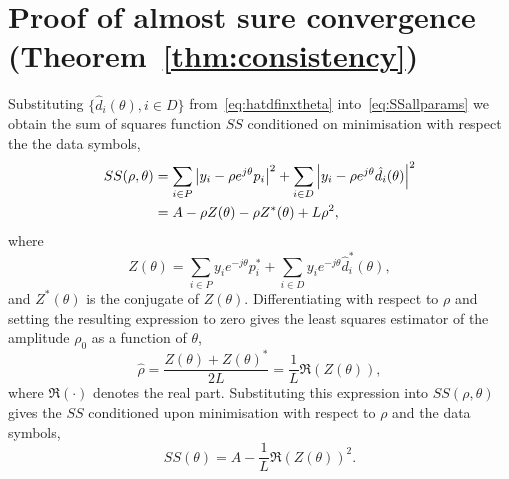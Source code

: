 \documentclass[journal]{IEEEtran}
\begin{document}
\section{Proof of almost sure convergence (Theorem~\ref{thm:consistency}) } \label{sec:proof-almost-sure}

Substituting $\{ \hat{d}_i(\theta), i \in D \}$ from~\eqref{eq:hatdfinxtheta} into~\eqref{eq:SSallparams} we obtain the sum of squares function $SS$ conditioned on minimisation with respect the the data symbols,
 \begin{align*}
SS(\rho, \theta) &=\sum_{i \in P} {\left\vert  y_i - \rho e^{j\theta} p_i  \right\vert}^2 + \sum_{i \in D} {\left\vert  y_i - \rho e^{j\theta} \hat{d_i}(\theta)  \right\vert}^2 \\
&= A - \rho Z(\theta) - \rho Z^*(\theta) + L \rho^2,
\end{align*}
where
\[
Z(\theta)  = \sum_{i \in P} y_i e^{-j\theta} p_i^* + \sum_{i \in D} y_i e^{-j\theta} \hat{d}_i^*(\theta),
\]
and $Z^*(\theta)$ is the conjugate of $Z(\theta)$.  Differentiating with respect to $\rho$ and setting the resulting expression to zero gives the least squares estimator of the amplitude $\rho_0$ as a function of $\theta$, 
\begin{equation}\label{eq:hatrhoZ}
\hat{\rho} = \frac{Z(\theta) + Z(\theta)^*}{2L} = \frac{1}{L}\Re(Z(\theta)),
\end{equation}
where $\Re(\cdot)$ denotes the real part.  Substituting this expression into $SS(\rho, \theta)$ gives the $SS$ conditioned upon minimisation with respect to $\rho$ and the data symbols,
\[
SS(\theta) = A - \frac{1}{L}\Re(Z(\theta))^2.
\]
\end{document}
